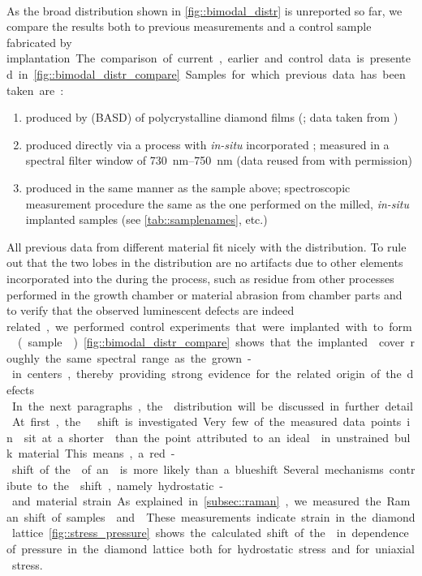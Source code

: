 	\\
	As the broad \ZPL distribution shown in \autoref{fig::bimodal_distr} is unreported so far, we compare the results both to previous measurements and a control sample fabricated by \si implantation.
	The comparison of current, earlier and control data is presented in \autoref{fig::bimodal_distr_compare}.
	Samples for which previous data has been taken are:
	\begin{enumerate}
		\item \nds produced by \basd (BASD) of polycrystalline \CVD diamond films (\cite{Neu2011a}; data taken from \cite{Benedikter2017a})
		\item \nds produced directly via a \CVD process with \textit{in-situ} incorporated \sivs; measured in a spectral filter window of \SIrange{730}{750}{nm} (data reused from \cite{Neu2012} with permission)
		\item \nds produced in the same manner as the sample above; spectroscopic measurement procedure the same as the one performed on the milled, \textit{in-situ} implanted samples (see \autoref{tab::samplenames}, \insituF etc.)
	\end{enumerate}
	All previous data from different \nd material fit nicely with the \ZPL distribution.
	To rule out that the two lobes in the distribution are no artifacts due to other elements incorporated into the \nds during the process, such as residue from other processes performed in the growth chamber or material abrasion from chamber parts and to verify that the observed luminescent defects are indeed \si related, we performed control experiments that were implanted with \si to form \sivs (sample \implantedTao).
	\autoref{fig::bimodal_distr_compare} shows that the implanted \sivs cover roughly the same spectral range as the grown-in centers, thereby providing strong evidence for the \si related origin of the defects.
	\\
	In the next paragraphs, the \ZPL distribution will be discussed in further detail.
	At first, the \ZPL \cwl shift is investigated.
	Very few of the measured data points in \gv sit at a shorter \cwl than the point attributed to an ideal \siv in unstrained bulk material.
	This means, a red-shift of the \ZPL of an \siv is more likely than a blueshift.
	Several mechanisms contribute to the \cwl shift, namely hydrostatic- and material strain.
	As explained in \autoref{subsec::raman}, we measured the Raman shift of samples \insituS and \implantedTao.
	These measurements indicate strain in the diamond lattice.
	\autoref{fig::stress_pressure} shows the calculated shift of the  \ZPL in dependence of pressure in the diamond lattice both for hydrostatic stress and for uniaxial stress.

